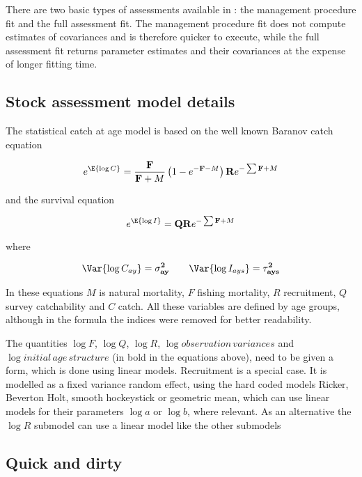 \documentclass[a4paper,english,10pt]{article}\usepackage[]{graphicx}\usepackage[]{color}
\begin{document}
There are two basic types of assessments available in : the management procedure fit and the full assessment fit. The management procedure fit does not compute estimates of covariances and is therefore quicker to execute, while the full assessment fit returns parameter estimates and their covariances at the expense of longer fitting time.

\subsection{Stock assessment model details}

The statistical catch at age model is based on the well known Baranov catch equation

\begin{equation*}
e^{\E{\log C}} = \frac{\mathbf{F}}{\mathbf{F}+M}\left(1 - e^{-\mathbf{F}-M}\right) \mathbf{R}e^{-\sum \mathbf{F} + M}
\end{equation*}

and the survival equation

\begin{equation*}
e^{\E{\log I}} = \mathbf{Q} \mathbf{R}e^{-\sum \mathbf{F} + M}
\end{equation*}

where 

\begin{equation*}
\Var{\log C_{ay}} = \mathbf{\sigma^2_{ay}} \qquad \Var{\log I_{ays}} = \mathbf{\tau^2_{ays}}
\end{equation*}

In these equations $M$ is natural mortality, $F$ fishing mortality, $R$ recruitment, $Q$ survey catchability and $C$ catch. All these variables are defined by age groups, although in the formula the indices were removed for better readability.
 
The quantities $\log{F}$, $\log{Q}$, $\log{R}$, $\log{observation\,variances}$ and $\log{ initial\,age\,structure}$ (in bold in the equations above), need to be given a form, which is done using linear models. Recruitment is a special case. It is modelled as a fixed variance random effect, using the hard coded models Ricker, Beverton Holt, smooth hockeystick or geometric mean, which can use linear models for their parameters $\log{a}$ or $\log{b}$, where relevant. As an alternative the $\log{R}$ submodel can use a linear model like the other submodels 

\subsection{Quick and dirty}
\end{document}
